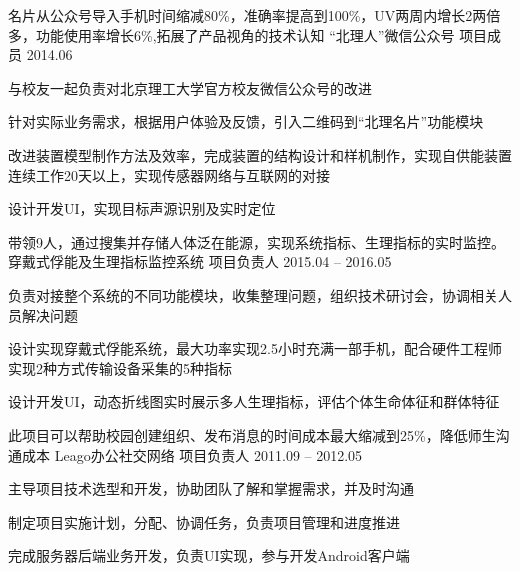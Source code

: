 \begin{cventries}
\cventry
{名片从公众号导入手机时间缩减80\%，准确率提高到100\%，UV两周内增长2两倍多，功能使用率增长6\%,拓展了产品视角的技术认知} %
{“北理人”微信公众号} %
{项目成员} %
{2014.06} %
{ %
\begin{cvitems}
\item {与校友一起负责对北京理工大学官方校友微信公众号的改进}
\item {针对实际业务需求，根据用户体验及反馈，引入二维码到“北理名片”功能模块}
\item{改进装置模型制作方法及效率，完成装置的结构设计和样机制作，实现自供能装置连续工作20天以上，实现传感器网络与互联网的对接}
\item{设计开发UI，实现目标声源识别及实时定位}
\end{cvitems} 
}

\cventry
{带领9人，通过搜集并存储人体泛在能源，实现系统指标、生理指标的实时监控。} %
{穿戴式俘能及生理指标监控系统} %
{项目负责人} %
{2015.04 -- 2016.05} %
{ %
\begin{cvitems}
\item {负责对接整个系统的不同功能模块，收集整理问题，组织技术研讨会，协调相关人员解决问题}
\item {设计实现穿戴式俘能系统，最大功率实现2.5小时充满一部手机，配合硬件工程师实现2种方式传输设备采集的5种指标}
\item{设计开发UI，动态折线图实时展示多人生理指标，评估个体生命体征和群体特征}
\end{cvitems} 
}


\cventry
{此项目可以帮助校园创建组织、发布消息的时间成本最大缩减到25\%，降低师生沟通成本} %
{Leago办公社交网络} %
{项目负责人} %
{2011.09 -- 2012.05} %
{ %
\begin{cvitems}
\item {主导项目技术选型和开发，协助团队了解和掌握需求，并及时沟通}
\item {制定项目实施计划，分配、协调任务，负责项目管理和进度推进}
\item{完成服务器后端业务开发，负责UI实现，参与开发Android客户端}
\end{cvitems}
}

\end{cventries}


